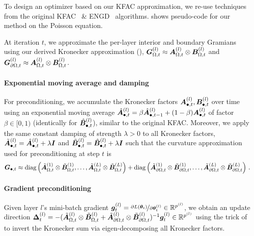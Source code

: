 To design an optimizer based on our KFAC approximation, we re-use techniques from the original KFAC~\cite{martens2015optimizing} \& ENGD~\cite{muller2023achieving} algorithms.
 shows pseudo-code for our method on the Poisson equation.

At iteration $t$, we approximate the per-layer interior and boundary Gramians using our derived Kronecker approximation (),
${\bm{G}}_{\Omega,t}^{(l)} \approx {\bm{A}}_{\Omega,t}^{(l)}\otimes {\bm{B}}_{\Omega,t}^{(l)}$ and ${\bm{G}}_{\partial \Omega, t}^{(l)}\approx {\bm{A}}_{\Omega,t}^{(l)}\otimes {\bm{B}}_{\Omega,t}^{(l)}$.

\paragraph{Exponential moving average and damping}
For preconditioning, we accumulate the Kronecker factors ${\bm{A}}^{(l)}_{\bullet,t}, {\bm{B}}^{(l)}_{\bullet,t}$ over time using an exponential moving average $\hat{{\bm{A}}}^{(l)}_{\bullet,t} = \beta \hat{{\bm{A}}}^{(l)}_{\bullet,t-1} + (1 - \beta) {\bm{A}}^{(l)}_{\bullet,t}$ of factor $\beta\in[0,1)$ (identically for $\hat{{\bm{B}}}^{(l)}_{\bullet, t}$), similar to the original KFAC.
Moreover, we apply the same constant damping of strength $\lambda>0$ to all Kronecker factors, $\tilde{{\bm{A}}}^{(l)}_{\bullet,t} = \hat{{\bm{A}}}^{(l)}_{\bullet,t} + \lambda {\bm{I}}$ and $\tilde{{\bm{B}}}^{(l)}_{\bullet,t} = \hat{{\bm{B}}}^{(l)}_{\bullet,t} + \lambda {\bm{I}}$ such that the curvature approximation used for preconditioning at step $t$ is
\begin{align*}
  {\bm{G}}_{\bullet, t}
  \approx
    \operatorname{diag}
    \left(
    \tilde{{\bm{A}}}^{(1)}_{\Omega,t} \otimes \tilde{{\bm{B}}}_{\Omega,t}^{(1)},
    \dots,
    \tilde{{\bm{A}}}^{(L)}_{\Omega,t} \otimes \tilde{{\bm{B}}}_{\Omega,t}^{(L)}
    \right)
  +
    \operatorname{diag}
    \left(
    \tilde{{\bm{A}}}^{(1)}_{\partial\Omega,t} \otimes \tilde{{\bm{B}}}_{\partial\Omega,t}^{(1)},
    \dots,
    \tilde{{\bm{A}}}^{(L)}_{\partial\Omega,t} \otimes \tilde{{\bm{B}}}_{\partial\Omega,t}^{(L)}
    \right)\,.
\end{align*}

\paragraph{Gradient preconditioning}
Given layer $l$'s mini-batch gradient ${\bm{g}}_t^{(l)} = \nicefrac{\partial L({\bm{\theta}}_t)}{\partial{\bm{\theta}}^{(l)}_t} \in {\mathbb{R}}^{p^{(l)}}$, we obtain an update direction ${\bm{\Delta}}_t^{(l)} = -(\tilde{{\bm{A}}}^{(l)}_{\Omega,t} \otimes \tilde{{\bm{B}}}^{(l)}_{\Omega,t} + \tilde{{\bm{A}}}^{(l)}_{\partial\Omega,t} \otimes \tilde{{\bm{B}}}^{(l)}_{\partial\Omega,t})^{-1} {\bm{g}}_t^{(l)} \in {\mathbb{R}}^{p^{(l)}}$ using the trick of \cite[Appendix I]{martens2015optimizing} to invert the Kronecker sum via eigen-decomposing all Kronecker factors.

